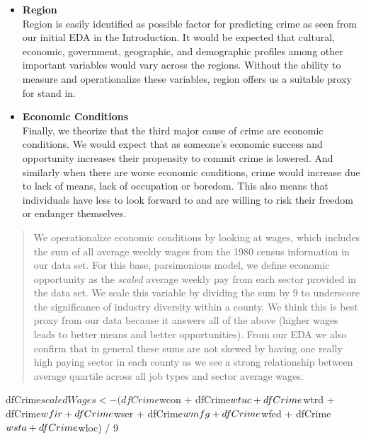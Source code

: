 \documentclass[]{article}
\newenvironment{Shaded}{}{}
\newcommand{\DecValTok}[1]{#1}
\newcommand{\NormalTok}[1]{#1}
\newcommand{\OperatorTok}[1]{#1}
\newcommand{\StringTok}[1]{\textcolor[rgb]{0.00,0.50,0.50}{#1}}
\begin{document}
\begin{itemize}
\item
  \textbf{Region}\\
  Region is easily identified as possible factor for predicting crime as
  seen from our initial EDA in the Introduction. It would be expected
  that cultural, economic, government, geographic, and demographic
  profiles among other important variables would vary across the
  regions. Without the ability to measure and operationalize these
  variables, region offers us a suitable proxy for stand in.
\item
  \textbf{Economic Conditions}\\
  Finally, we theorize that the third major cause of crime are economic
  conditions. We would expect that as someone's economic success and
  opportunity increases their propensity to commit crime is lowered. And
  similarly when there are worse economic conditions, crime would
  increase due to lack of means, lack of occupation or boredom. This
  also means that individuals have less to look forward to and are
  willing to risk their freedom or endanger themselves.
\end{itemize}

\begin{quote}
We operationalize economic conditions by looking at wages, which
includes the sum of all average weekly wages from the 1980 census
information in our data set. For this base, parsimonious model, we
define economic opportunity as the \emph{scaled} average weekly pay from
each sector provided in the data set. We scale this variable by dividing
the sum by 9 to underscore the significance of industry diversity within
a county. We think this is best proxy from our data because it answers
all of the above (higher wages leads to better means and better
opportunities). From our EDA we also confirm that in general these sums
are not skewed by having one really high paying sector in each county as
we see a strong relationship between average quartile across all job
types and sector average wages.
\end{quote}

\begin{Shaded}
\begin{Highlighting}[]
\NormalTok{dfCrime}\OperatorTok{$}\NormalTok{scaledWages<-(dfCrime}\OperatorTok{$}\NormalTok{wcon }\OperatorTok{+}\StringTok{ }\NormalTok{dfCrime}\OperatorTok{$}\NormalTok{wtuc }\OperatorTok{+}\StringTok{ }\NormalTok{dfCrime}\OperatorTok{$}\NormalTok{wtrd }\OperatorTok{+}\StringTok{ }\NormalTok{dfCrime}\OperatorTok{$}\NormalTok{wfir }\OperatorTok{+}
\StringTok{    }\NormalTok{dfCrime}\OperatorTok{$}\NormalTok{wser }\OperatorTok{+}\StringTok{ }\NormalTok{dfCrime}\OperatorTok{$}\NormalTok{wmfg }\OperatorTok{+}\StringTok{ }\NormalTok{dfCrime}\OperatorTok{$}\NormalTok{wfed }\OperatorTok{+}\StringTok{ }\NormalTok{dfCrime}\OperatorTok{$}\NormalTok{wsta }\OperatorTok{+}\StringTok{ }\NormalTok{dfCrime}\OperatorTok{$}\NormalTok{wloc) }\OperatorTok{/}\StringTok{ }\DecValTok{9}
\end{Highlighting}
\end{Shaded}
\end{document}
